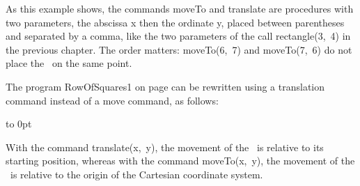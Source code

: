 \noindent As this example shows, the commands {\idt moveTo} and {\idt translate}
are procedures with two parameters, the abscissa {\idt x} then the ordinate {\idt y},
placed between parentheses and separated by a comma, like the two parameters
of the call {\idt rectangle(3,\ 4)} in the previous chapter. The order matters:
{\idt moveTo(6,\ 7)} and {\idt moveTo(7,\ 6)} do not place the \robot\ on the same point.


The program {\idt RowOfSquares1} on page
\pageref{prog:LigneDeCarres1} can be rewritten us\-ing a
translation command instead of a move command,
as follows:\\
{\raggedright%
\vspace{\baselineskip}%
\vbox to 0pt{\vspace*{\baselineskip}\vspace*{6cm}%
}%
\vspace*{-1cm}%

\vspace{0.5cm}%
}
 
 With the command {\idt translate(x,\ y)}, the movement of the \robot\ is relative to its starting
position, whereas with the command {\idt moveTo(x,\ y)}, the movement of the \robot\ is relative 
to the origin of the Cartesian coordinate system.
 
